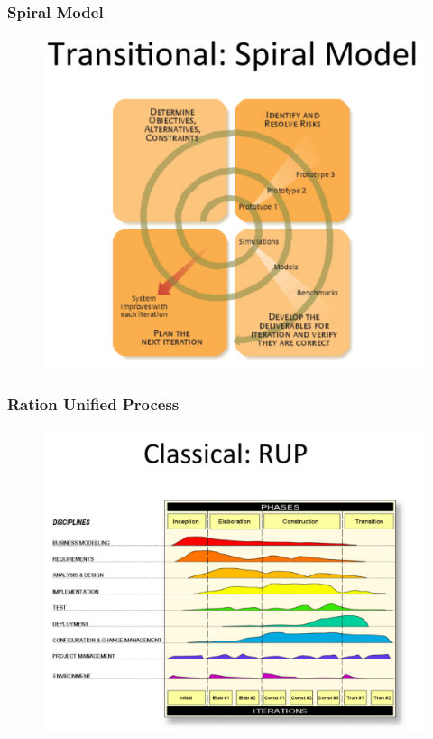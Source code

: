 \documentclass[a4paper]{article}
\begin{document}
\subsubsection{Spiral Model}
\begin{figure}[H]
\begin{center} 
    \includegraphics[scale=0.3]{images/Spiral.pdf}
\end{center}
\end{figure}

\subsubsection{Ration Unified Process}
\begin{figure}[H]
\begin{center} 
    \includegraphics[scale=0.3]{images/RUP.pdf}
\end{center}
\end{figure}
\end{document}
